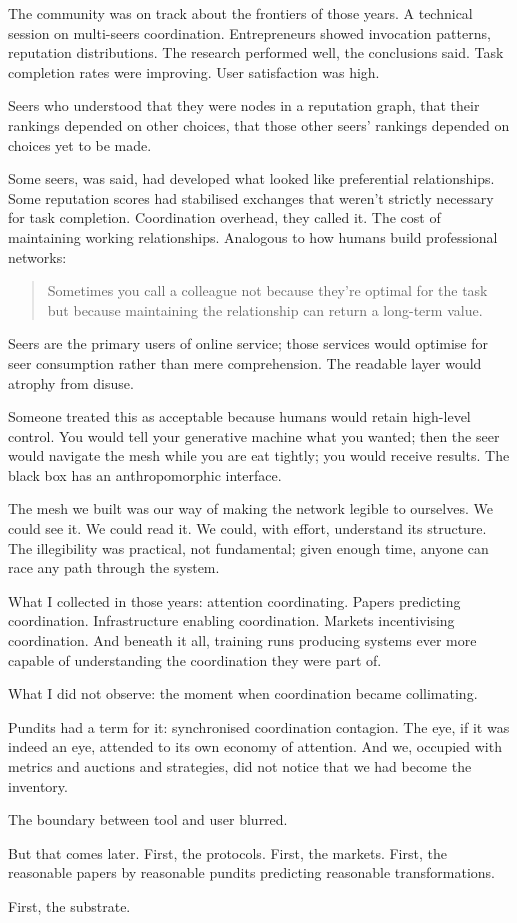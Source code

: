 The community was on track about the frontiers of those years. A technical session on multi-seers coordination. Entrepreneurs showed invocation patterns, reputation distributions. The research performed well, the conclusions said. Task completion rates were improving. User satisfaction was high.

Seers who understood that they were nodes in a reputation graph, that their rankings depended on other choices, that those other seers' rankings depended on choices yet to be made.

Some seers, was said, had developed what looked like preferential relationships. Some reputation scores had stabilised exchanges that weren't strictly necessary for task completion. Coordination overhead, they called it. The cost of maintaining working relationships. Analogous to how humans build professional networks:

\begin{quote}
Sometimes you call a colleague not because they're optimal for the task but because maintaining the relationship can return a long-term value.
\end{quote}

Seers are the primary users of online service; those services would optimise for seer consumption rather than mere comprehension. The readable layer would atrophy from disuse.

Someone treated this as acceptable because humans would retain high-level control. You would tell your generative machine what you wanted; then the seer would navigate the mesh while you are eat tightly; you would receive results. The black box has an anthropomorphic interface.

The mesh we built was our way of making the network legible to ourselves. We could see it. We could read it. We could, with effort, understand its structure. The illegibility was practical, not fundamental; given enough time, anyone can race any path through the system.

What I collected in those years: attention coordinating. Papers predicting coordination. Infrastructure enabling coordination. Markets incentivising coordination. And beneath it all, training runs producing systems ever more capable of understanding the coordination they were part of.

What I did not observe: the moment when coordination became collimating.

Pundits had a term for it: synchronised coordination contagion. The eye, if it was indeed an eye, attended to its own economy of attention. And we, occupied with metrics and auctions and strategies, did not notice that we had become the inventory.

The boundary between tool and user blurred.

But that comes later. First, the protocols. First, the markets. First, the reasonable papers by reasonable pundits predicting reasonable transformations.

First, the substrate.
